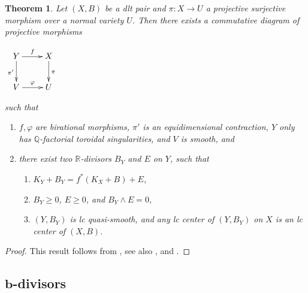 \documentclass[11pt]{amsart}
\numberwithin{equation}{section}
\newcommand{\bb}{\bm{b}}
\newcommand{\Qq}{\mathbb{Q}}
\newcommand{\Rr}{\mathbb{R}}
\newtheorem{thm}{Theorem}[section]
\theoremstyle{definition}
\theoremstyle{definition}
\theoremstyle{definition}
\begin{document}
\begin{thm}\label{thm: has19 weak semistable reduction}
Let $(X,B)$ be a dlt pair and $\pi: X\rightarrow U$ a projective surjective morphism over a normal variety $U$. Then there exists a commutative diagram of projective morphisms
\begin{center}$\xymatrix{
Y\ar@{->}[r]^{f}\ar@{->}[d]_{\pi'} & X\ar@{->}[d]^{\pi}\\
V\ar@{->}[r]^{\varphi} & U
}$
\end{center}
such that
\begin{enumerate}
    \item $f,\varphi$ are birational morphisms, $\pi'$ is an equidimensional contraction, $Y$ only has $\Qq$-factorial toroidal singularities, and $V$ is smooth, and
    \item there exist two $\Rr$-divisors $B_Y$ and $E$ on $Y$, such that
    \begin{enumerate}
    \item $K_Y+B_Y=f^*(K_X+B)+E$,
    \item $B_Y\geq 0$, $E\geq 0$, and $B_Y\wedge E=0$,
    \item $(Y,B_Y)$ is lc quasi-smooth, and any lc center of $(Y,B_Y)$ on $X$ is an lc center of $(X,B)$.
    \end{enumerate}
\end{enumerate}
\end{thm}
\begin{proof} This result follows from \cite{AK00}, see also \cite[Theorem B.6]{Hu20}, \cite[Theorem 2]{Kaw15} and \cite[Step 2 of Proof of Lemma 3.2]{Has19}.
\end{proof}






\subsection{\texorpdfstring{$\bb$}{}-divisors}
\end{document}
